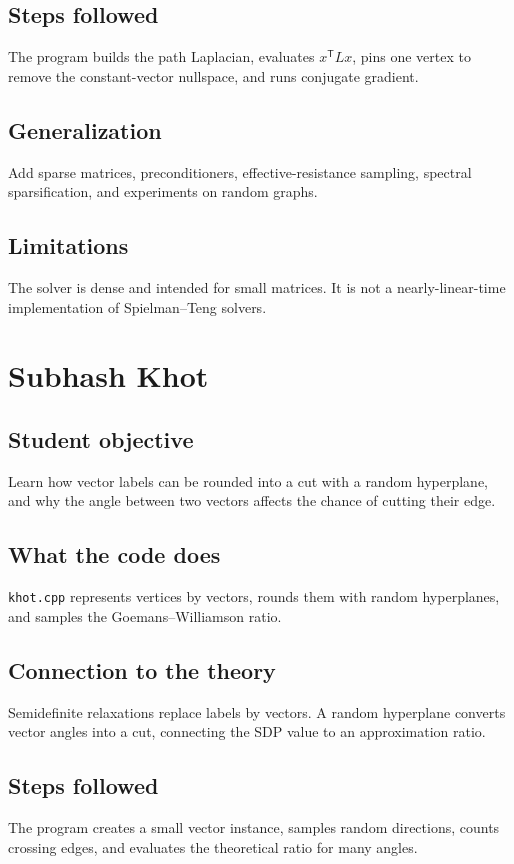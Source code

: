 \documentclass[11pt]{book}
\begin{document}
\section{Steps followed}
The program builds the path Laplacian, evaluates $x^{\mathsf T}Lx$, pins one vertex to remove the constant-vector nullspace, and runs conjugate gradient.

\section{Generalization}
Add sparse matrices, preconditioners, effective-resistance sampling, spectral sparsification, and experiments on random graphs.

\section{Limitations}
The solver is dense and intended for small matrices. It is not a nearly-linear-time implementation of Spielman--Teng solvers.

\chapter{Subhash Khot}
\section{Student objective}
Learn how vector labels can be rounded into a cut with a random hyperplane, and why the angle between two vectors affects the chance of cutting their edge.
\section{What the code does}
\texttt{khot.cpp} represents vertices by vectors, rounds them with random hyperplanes, and samples the Goemans--Williamson ratio.

\section{Connection to the theory}
Semidefinite relaxations replace labels by vectors. A random hyperplane converts vector angles into a cut, connecting the SDP value to an approximation ratio.

\section{Steps followed}
The program creates a small vector instance, samples random directions, counts crossing edges, and evaluates the theoretical ratio for many angles.
\end{document}
